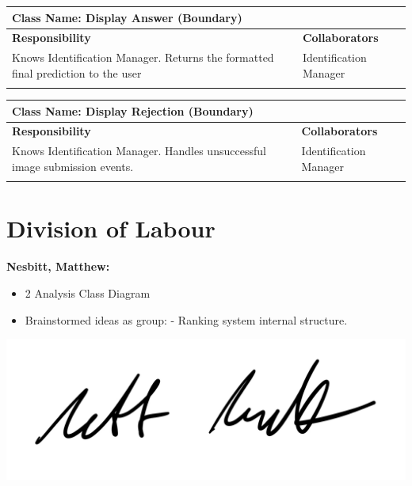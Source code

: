 \documentclass[]{article}
\begin{document}
	\begin{table}[H]
		\centering
		\begin{tabular}{|p{8cm}|p{8cm}|}
		\hline
		\multicolumn{2}{|l|}{\textbf{Class Name:} Display Answer (Boundary)} \\
		\hline
		\textbf{Responsibility} & \textbf{Collaborators} \\
		\hline
		Knows Identification Manager. \newline Returns the formatted final prediction to the user & Identification Manager \\
		\vspace{1in} & \\
		\hline
		\end{tabular}
	\end{table}

	\begin{table}[H]
		\centering
		\begin{tabular}{|p{8cm}|p{8cm}|}
		\hline
		\multicolumn{2}{|l|}{\textbf{Class Name:} Display Rejection (Boundary)} \\
		\hline
		\textbf{Responsibility} & \textbf{Collaborators} \\
		\hline
		Knows Identification Manager. \newline Handles unsuccessful image submission events. & Identification Manager \\
		\vspace{1in} & \\
		\hline
		\end{tabular}
	\end{table}

\appendix
\section{Division of Labour}
\label{sec:division_of_labour}
\textbf{Nesbitt, Matthew:}
\begin{itemize}
	\item 2 Analysis Class Diagram
	\item Brainstormed ideas as group:
		\subitem - Ranking system internal structure.
\end{itemize}
\includegraphics[scale=0.15]{mattsignature.jpg}
\end{document}

